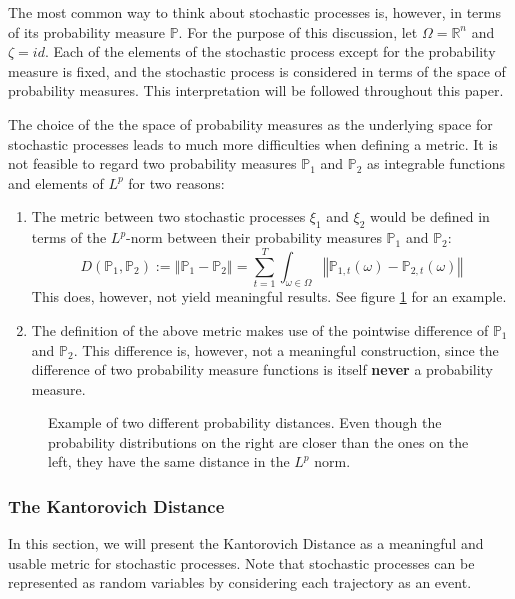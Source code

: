 \documentclass[a4paper, 12pt] {article}
\begin{document}
The most common way to think about stochastic processes is, however, in terms of its probability measure $\mathbb{P}$.
For the purpose of this discussion, let $\Omega=\mathbb{R}^n$ and $\zeta=id$.
Each of the elements of the stochastic process except for the probability measure is fixed, and the stochastic process is considered in terms of the space of probability measures.
This interpretation will be followed throughout this paper.

The choice of the the space of probability measures as the underlying space for stochastic processes leads to much more difficulties when defining a metric. It is not feasible to regard two probability measures $\mathbb{P}_1$ and $\mathbb{P}_2$ as integrable functions and elements of $L^p$ for two reasons:
\begin{enumerate}
\item The metric between two stochastic processes $\xi_1$ and $\xi_2$ would be defined in terms of the $L^p$-norm between their probability measures $\mathbb{P}_1$ and $\mathbb{P}_2$:
  \begin{equation}
    \label{eq:prob-measure-metric-as-Lpnorm}
    D(\mathbb{P}_1,\mathbb{P}_2) := \left\Vert \mathbb{P}_1-\mathbb{P}_2\right\Vert = \sum_{t=1}^T\int_{\omega\in\Omega}\left\Vert \mathbb{P}_{1,t}(\omega)-\mathbb{P}_{2,t}(\omega)\right\Vert
  \end{equation}
  This does, however, not yield meaningful results. See figure \ref{fig:example-wrong-distance} for an example.
\item The definition of the above metric makes use of the pointwise difference of $\mathbb{P}_1$ and $\mathbb{P}_2$. 
  This difference is, however, not a meaningful construction, since the difference of two probability measure functions is itself \textbf{never} a probability measure.
\end{enumerate}
\begin{figure}
  \centering
  \caption{Example of two different probability distances. 
    Even though the probability distributions on the right are closer than the ones on the left, they have the same distance in the $L^p$ norm.}
  \label{fig:example-wrong-distance}
\end{figure}
\subsubsection{The Kantorovich Distance}
In this section, we will present the Kantorovich Distance as a meaningful and usable metric for stochastic processes. 
Note that stochastic processes can be represented as random variables by considering each trajectory as an event.
\end{document}
